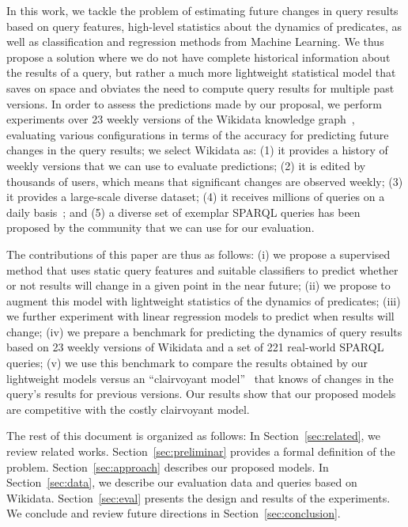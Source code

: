 \documentclass[runningheads]{llncs}
\begin{document}
In this work, we tackle the problem of estimating future changes in query results based on query features, high-level statistics about the dynamics of predicates, as well as classification and regression methods from Machine Learning. We thus propose a solution where we do not have complete historical information about the results of a query, but rather a much more lightweight statistical model that saves on space and obviates the need to compute query results for multiple past versions. In order to assess the predictions made by our proposal, we perform experiments over 23 weekly versions of the Wikidata knowledge graph~\cite{VrandecicK14}, evaluating various configurations in terms of the accuracy for predicting future changes in the query results; we select Wikidata as: (1) it provides a history of weekly versions that we can use to evaluate predictions; (2) it is edited by thousands of users, which means that significant changes are observed weekly; (3) it provides a large-scale diverse dataset; (4) it receives millions of queries on a daily basis~\cite{MalyshevKGGB18}; and (5) a diverse set of exemplar SPARQL queries has been proposed by the community that we can use for our evaluation.

The contributions of this paper are thus as follows: (i) we propose a supervised method that uses static query features and suitable classifiers to predict whether or not results will change in a given point in the near future; (ii) we propose to augment this model with lightweight statistics of the dynamics of predicates; (iii) we further experiment with linear regression models to predict when results will change; (iv) we prepare a benchmark for predicting the dynamics of query results based on 23 weekly versions of Wikidata and a set of 221 real-world SPARQL queries; (v) we use this benchmark to compare the results obtained by our lightweight models versus an ``clairvoyant model''~\cite{KnuthHS16} that knows of changes in the query's results for previous versions. Our results show that our proposed models are competitive with the costly clairvoyant model.

The rest of this document is organized as follows: In Section~\ref{sec:related}, we review related works. Section~\ref{sec:preliminar} provides a formal definition of the problem. Section~\ref{sec:approach} describes our proposed models. In Section~\ref{sec:data}, we describe our evaluation data and queries based on Wikidata. Section~\ref{sec:eval} presents the design and results of the experiments. We conclude and review future directions in Section~\ref{sec:conclusion}.
\end{document}

